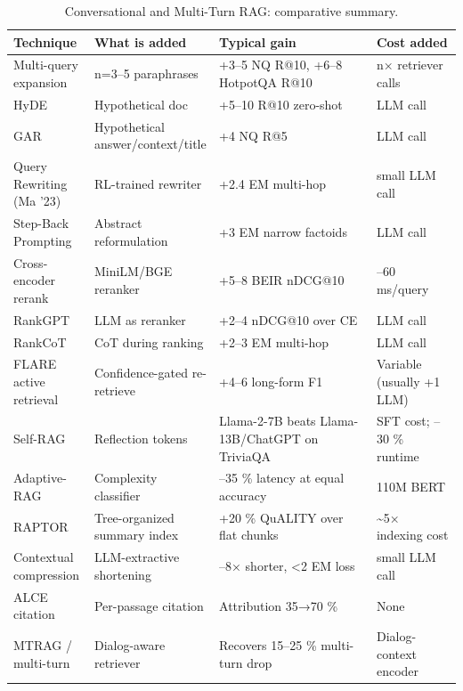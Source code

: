 \documentclass{article}
\begin{document}
\begin{table}[t]
\centering
\caption{Conversational and Multi-Turn RAG: comparative summary.}
\label{tab:conversational-and-multi-turn-rag}
\begin{tabular}{>{\raggedright\arraybackslash}p{0.1875\linewidth}
  >{\raggedright\arraybackslash}p{0.2578\linewidth}
  >{\raggedright\arraybackslash}p{0.3594\linewidth}
  >{\raggedright\arraybackslash}p{0.1953\linewidth}}
\toprule
Technique & What is added & Typical gain & Cost added \\
\midrule
Multi-query expansion & n=3--5 paraphrases & +3--5 NQ R@10, +6--8 HotpotQA R@10 & n× retriever calls \\
HyDE & Hypothetical doc & +5--10 R@10 zero-shot & 1 LLM call \\
GAR & Hypothetical answer/context/title & +4 NQ R@5 & 1 LLM call \\
Query Rewriting (Ma '23) & RL-trained rewriter & +2.4 EM multi-hop & 1 small LLM call \\
Step-Back Prompting & Abstract reformulation & +3 EM narrow factoids & 1 LLM call \\
Cross-encoder rerank & MiniLM/BGE reranker & +5--8 BEIR nDCG@10 & 30--60 ms/query \\
RankGPT & LLM as reranker & +2--4 nDCG@10 over CE & 1 LLM call \\
RankCoT & CoT during ranking & +2--3 EM multi-hop & 1 LLM call \\
FLARE active retrieval & Confidence-gated re-retrieve & +4--6 long-form F1 & Variable (usually +1 LLM) \\
Self-RAG & Reflection tokens & Llama-2-7B beats Llama-13B/ChatGPT on TriviaQA & SFT cost; --30 \% runtime \\
Adaptive-RAG & Complexity classifier & --35 \% latency at equal accuracy & 110M BERT \\
RAPTOR & Tree-organized summary index & +20 \% QuALITY over flat chunks & \textasciitilde5× indexing cost \\
Contextual compression & LLM-extractive shortening & 4--8× shorter, \textless2 EM loss & 1 small LLM call \\
ALCE citation & Per-passage citation & Attribution 35→70 \% & None \\
MTRAG / multi-turn & Dialog-aware retriever & Recovers 15--25 \% multi-turn drop & Dialog-context encoder \\
\end{tabular}
\end{table}
\end{document}
